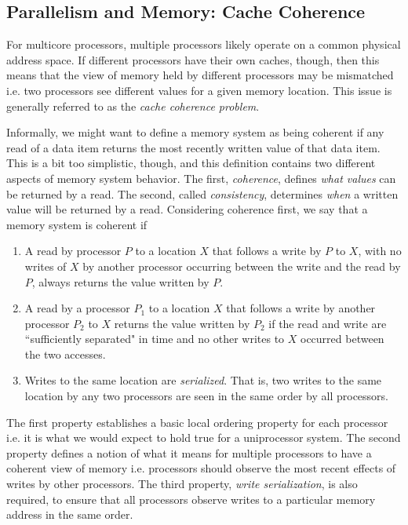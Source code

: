 \documentclass[10pt,a4paper]{article}
\begin{document}
\subsection{Parallelism and Memory: Cache Coherence}

For multicore processors, multiple processors likely operate on a common physical address space. If different processors have their own caches, though, then this means that the view of memory held by different processors may be mismatched i.e. two processors see different values for a given memory location. This issue is generally referred to as the \textit{cache coherence problem}.

Informally, we might want to define a memory system as being coherent if any read of a data item returns the most recently written value of that data item. This is a bit too simplistic, though, and this definition contains two different aspects of memory system behavior. The first, \textit{coherence}, defines \textit{what values} can be returned by a read. The second, called \textit{consistency}, determines \textit{when} a written value will be returned by a read. Considering coherence first, we say that a memory system is coherent if
\begin{enumerate}
    \item A read by processor $P$ to a location $X$ that follows a write by $P$ to $X$, with no writes of $X$ by another processor occurring between the write and the read by $P$, always returns the value written by $P$.
    \item A read by a processor $P_1$ to a location $X$ that follows a write by another processor $P_2$ to $X$ returns the value written by $P_2$ if the read and write are ``sufficiently separated" in time and no other writes to $X$ occurred between the two accesses.
    \item Writes to the same location are \textit{serialized}. That is, two writes to the same location by any two processors are seen in the same order by all processors.
\end{enumerate}

The first property establishes a basic local ordering property for each processor i.e. it is what we would expect to hold true for a uniprocessor system. The second property defines a notion of what it means for multiple processors to have a coherent view of memory i.e. processors should observe the most recent effects of writes by other processors. The third property, \textit{write serialization}, is also required, to ensure that all processors observe writes to a particular memory address in the same order. 
\end{document}
